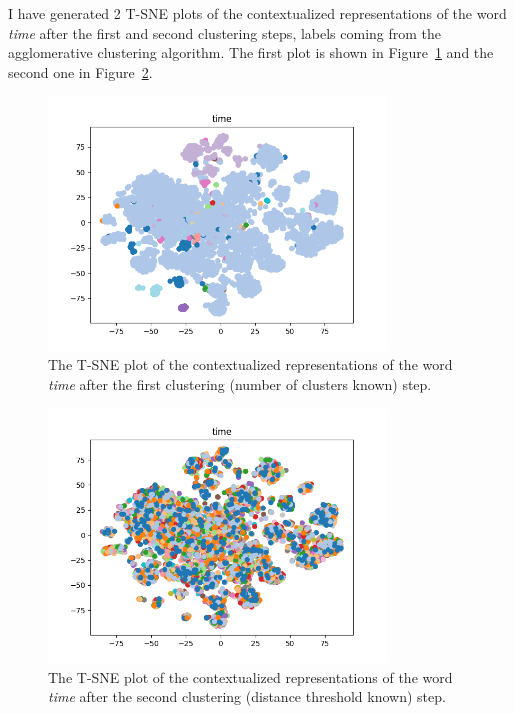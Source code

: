 \documentclass[11pt]{article}
\begin{document}
I have generated 2 T-SNE plots of the contextualized representations of the word \textit{time} after the first and second clustering steps, labels coming from the agglomerative clustering algorithm.
The first plot is shown in Figure~\ref{fig:time_1} and the second one in Figure~\ref{fig:time_2}.

\begin{figure}
  \centering
  \includegraphics[width=0.8\textwidth]{time_1.png}
  \caption{The T-SNE plot of the contextualized representations of the word \textit{time} after the first clustering (number of clusters known) step.}
  \label{fig:time_1}
\end{figure}

\begin{figure}
  \centering
  \includegraphics[width=0.8\textwidth]{time_2.png}
  \caption{The T-SNE plot of the contextualized representations of the word \textit{time} after the second clustering (distance threshold known) step.}
  \label{fig:time_2}
\end{figure}
\end{document}
